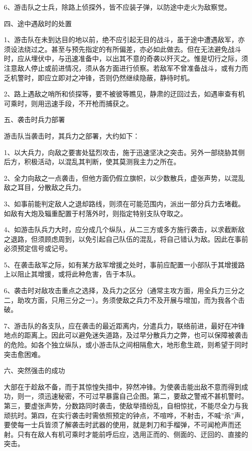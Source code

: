6、游击队之士兵，除路上侦探外，皆不应装子弹，以防途中走火为敌察觉。

四、途中遇敌时的处置

1、游击队在未到达目的地以前，绝不应引起无目的战斗，虽于途中遭遇敌军，亦须设法绕过之。甚至与预先指定的有所偏差，亦必如此做去。但在无法避免战斗时，应从埋伏中，与迅速准备中，以出其不意的奇袭以歼灭之。惟是切行之际，须注意敌人停止或前进情况，须从各方面进行侦察。若敌军不曾准备战斗，或有力而乏机警时，即应立即对之冲锋，否则仍然继续隐蔽，静待时机。

2、路上遇敌之哨所和侦探等，要不被彼等瞧见，静肃的迂回过去，如遇审查有机可乘时，则用迅速手段，不开枪而捕获之。

五、袭击时兵力部署

游击队当袭击时，其兵力之部署，大约如下：

1、以大兵力，向敌之要害处猛烈攻击，施于迅速坚决之突击。另外一部绕胁其侧后方，积极活动，以混乱其判断，使其莫测我主力之所在。

2、全力向敌之一点袭击，但他方面仍假立旗帜，以少数散兵，虚张声势，以混乱敌之耳目，分散敌之兵力。

3、如事前能判定敌人之退却路线，则须在可能范围内，派出一部分兵力去堵截。如敌有大炮及辎重配置于村落外时，则指定特别支队夺取之。

4、如游击队兵力大时，应分成几个纵队，从二三方或多方施行袭击，以求截断敌之退路，但须顾虑周到，以免引起自己队伍的混乱，将自己错认为敌。因此在事前必须预定信号或记号。

5、在袭击敌军之际，如有某方敌军增援之处时，事前应配置一小部队于其增援路上以阻止其增援，或将此种危害，告于本队。

6、袭击时对敌攻击重点之选择，及兵力之区分（通常主攻方面，用全兵力三分之二，助攻方面，只用三分之一）。务须使敌之兵力不及开展与增加，而为我各个击破。

7、游击队的各支队，应在袭击的最近距离内，分遣兵力，联络前进，最好在冲锋地点的距离上。因此可以避免迷失道路，及过早分散兵力之弊，也可以保障被袭击的危险。如各个独立纵队，或小游击队之间相隔愈大，地形愈生疏，则希望于同时突击愈困难。

六、突然强击的成功

大部在于趁敌不备，而于其惊惶失措中，猝然冲锋。为使袭击能出敌不意而得到成功，则一，须迅速秘密，不可过早暴露自己企图。第二，要敌之警戒不甚机警时。第三，要虚张声势，分数路同时袭击，使敌举措纷乱，自相惊扰，不能尽全力与我顽抗时。第四，在实行袭击时需依照预定的钟点，不喧哗，不射击，不喊“杀”声，要使每一士兵皆须了解袭击时武器的使用，就是刺刀和手榴弹，不可闻枪声而还射。只有在敌人有机可乘时才能前呼后应，选用正而的、侧面的、迂回的、直接的突击。

